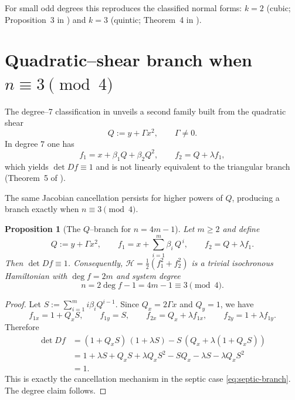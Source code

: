 \documentclass[11pt]{article}%
\theoremstyle{plain}
\newtheorem{proposition}[theorem]{Proposition}
\theoremstyle{definition}
\begin{document}
For small odd degrees this reproduces the classified normal forms: $k=2$
(cubic; Proposition~3 in \cite{BraLliMer}) and $k=3$ (quintic; Theorem~4 in
\cite{BraLliMer}).

\section{Quadratic--shear branch when $n\equiv3\pmod 4$}

The degree--7 classification in \cite{BraLliMer} unveils a second family built
from the quadratic shear
\begin{equation}
\label{eq:Q-def}Q:=y+\Gamma x^{2},\qquad\Gamma\neq0.
\end{equation}
In degree $7$ one has
\begin{equation}
\label{eq:septic-branch}f_{1}=x+\beta_{1} Q+\beta_{2} Q^{2},\qquad
f_{2}=Q+\lambda f_{1},
\end{equation}
which yields $\det Df\equiv1$ and is not linearly equivalent to the triangular
branch (Theorem~5 of \cite{BraLliMer}).

The same Jacobian cancellation persists for higher powers of $Q$, producing a
branch exactly when $n\equiv3\pmod 4$.

\begin{proposition}
[The $Q$--branch for $n=4m-1$]\label{prop:Q-branch} Let $m\geq2$ and define
\begin{equation}
Q:=y+\Gamma x^{2},\qquad f_{1}=x+\sum_{i=1}^{m}\beta_{i}\,Q^{\,i},\qquad
f_{2}=Q+\lambda f_{1}.\label{eq:Q-branch}%
\end{equation}
Then $\det Df\equiv1$. Consequently, $\mathcal{H}=\tfrac{1}{2}(f_{1}^{2}%
+f_{2}^{2})$ is a trivial isochronous Hamiltonian with $\deg f=2m$ and system
degree
\[
n=2\deg f-1=4m-1\equiv3\pmod 4.
\]

\end{proposition}

\begin{proof}
Let $S:=\sum_{i=1}^m i\beta_i Q^{i-1}$. Since $Q_x=2\Gamma x$ and $Q_y=1$, we have
\begin{equation*}
f_{1x}=1+Q_x S,\qquad f_{1y}=S,\qquad
f_{2x}=Q_x+\lambda f_{1x},\qquad f_{2y}=1+\lambda f_{1y}.
\end{equation*}
Therefore
\begin{align*}
\det Df
&= (1+Q_xS)\,(1+\lambda S)-S\,(Q_x+\lambda(1+Q_xS))\\
&= 1 + \lambda S + Q_x S + \lambda Q_x S^2 - S Q_x - \lambda S - \lambda Q_x S^2\\
&= 1.
\end{align*}
This is exactly the cancellation mechanism in the septic case \eqref{eq:septic-branch}. The degree claim follows.
\end{proof}
\end{document}
